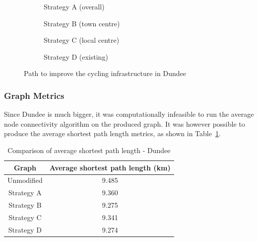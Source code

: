 \documentclass[12pt,a4paper]{report}
\begin{document}
\begin{figure}[ht]
    \centering
    \begin{subfigure}[ht]{0.47\textwidth}
        \centering
        
        \caption{Strategy A (overall)}
        \label{fig:overall dundee}
    \end{subfigure}
    \hfill
    \begin{subfigure}[ht]{0.47\textwidth}
        \centering
        
        \caption{Strategy B (town centre)}
        \label{fig:centre dundee}
    \end{subfigure}
    \hfill
    \begin{subfigure}[ht]{0.47\textwidth}
        \centering
        
        \caption{Strategy C (local centre)}
        \label{fig:local dundee}
    \end{subfigure}
    \hfill
    \begin{subfigure}[ht]{0.47\textwidth}
        \centering
        
        \caption{Strategy D (existing)}
        \label{fig:existing dundee}
    \end{subfigure}
       \caption{Path to improve the cycling infrastructure in Dundee}
       \label{fig:path dundee}
\end{figure}

\subsubsection*{Graph Metrics}
Since Dundee is much bigger, it was computationally infeasible to run the average node connectivity algorithm on the produced graph. It was however possible to produce the average shortest path length metrics, as shown in Table~\ref{tab:avg dundee}.

\begin{table}[ht!]
    \centering
    \begin{tabular}{|c|c|}
        \hline
        Graph & Average shortest path length (km) \\
        \hline
        Unmodified & 9.485 \\
        Strategy A & 9.360 \\
        Strategy B & 9.275 \\
        Strategy C & 9.341 \\
        Strategy D & 9.274 \\
        \hline
    \end{tabular}
    \caption{Comparison of average shortest path length - Dundee}
    \label{tab:avg dundee}
\end{table}
\end{document}
